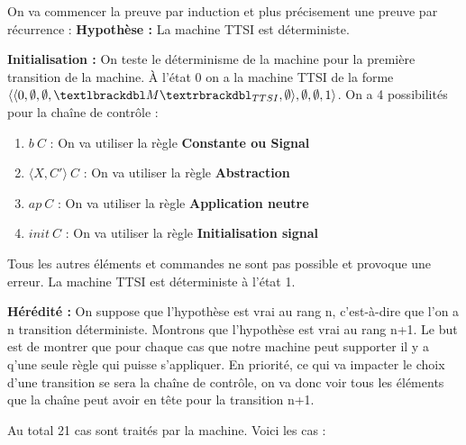 \documentclass[10pt,a4paper]{report}
\begin{document}
	
	On va commencer la preuve par induction et plus précisement une preuve par récurrence :
	\smallbreak
	\textbf{Hypothèse :} La machine TTSI est déterministe.
	\bigbreak
	
	
	\textbf{Initialisation :}  On teste le déterminisme de la machine pour la première transition de la machine. À l'état 0 on a la machine TTSI de la forme $\langle\langle 0,\emptyset,\emptyset,\textlbrackdbl M\textrbrackdbl_{TTSI},\emptyset\rangle,\emptyset,\emptyset,1\rangle$. 
	On a 4 possibilités pour la chaîne de contrôle :
	\smallbreak
	\begin{enumerate}
		\item $b~C$ : On va utiliser la règle \textbf{Constante ou Signal}
		\smallbreak
		\item $\langle X,C'\rangle~C$ : On va utiliser la règle \textbf{Abstraction}
		\smallbreak
		\item $ap~C$ : On va utiliser la règle \textbf{Application neutre}
		\smallbreak
		\item $init~C$ : On va utiliser la règle \textbf{Initialisation signal}
	\end{enumerate}
	Tous les autres éléments et commandes ne sont pas possible et provoque une erreur. La machine TTSI est déterministe à l'état 1.
	\bigbreak
	
	 
	\textbf{Hérédité :} On suppose que l'hypothèse est vrai au rang n, c'est-à-dire que l'on a n transition déterministe. Montrons que l'hypothèse est vrai au rang n+1. Le but est de montrer que pour chaque cas que notre machine peut supporter il y a q'une seule règle qui puisse s'appliquer. En priorité, ce qui va impacter le choix d'une transition se sera la chaîne de contrôle, on va donc voir tous les éléments que la chaîne peut avoir en tête pour la transition n+1. 
	\bigbreak
	
	
	Au total 21 cas sont traités par la machine. Voici les cas :
	\medbreak
	
\end{document}
